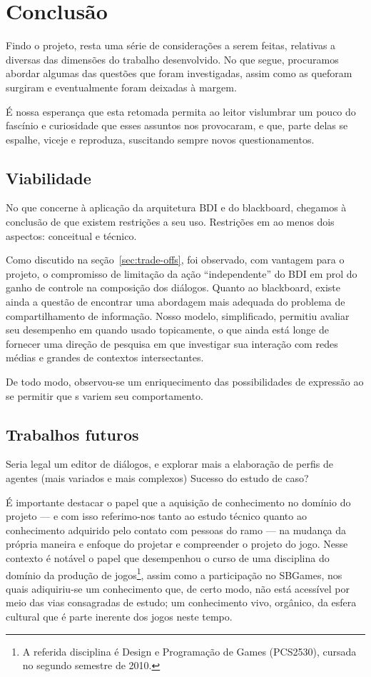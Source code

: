 \chapter{Conclusão}


Findo o projeto, resta uma série de considerações a serem feitas,
relativas a diversas das dimensões do trabalho desenvolvido. No que
segue, procuramos abordar algumas das questões que foram investigadas,
assim como as queforam surgiram e eventualmente foram deixadas à
margem.


É nossa esperança que esta retomada permita ao leitor vislumbrar um
pouco do fascínio e curiosidade que esses assuntos nos provocaram, e
que, parte delas se espalhe, viceje e reproduza, suscitando sempre
novos questionamentos.

\section{Viabilidade}

No que concerne à aplicação da arquitetura BDI e do blackboard,
chegamos à conclusão de que existem restrições a seu uso. Restrições
em ao menos dois aspectos: conceitual e técnico. 

Como discutido na seção~\ref{sec:trade-offs}, foi observado, com
vantagem para o projeto, o compromisso de limitação da ação
``independente'' do BDI em prol do ganho de controle na composição dos
diálogos. Quanto ao blackboard, existe ainda a questão de encontrar
uma abordagem mais adequada do problema de compartilhamento de
informação. Nosso modelo, simplificado, permitiu avaliar seu
desempenho em quando usado topicamente, o que ainda está longe de
fornecer uma direção de pesquisa em que investigar sua interação com
redes médias e grandes de contextos intersectantes.

De todo modo, observou-se um enriquecimento das possibilidades de
expressão ao se permitir que \npc{}s variem seu comportamento.

\section{Trabalhos futuros}

Seria legal um editor de diálogos, e explorar mais a elaboração de
perfis de agentes (mais variados e mais complexos)
Sucesso do estudo de caso?


É importante destacar o papel que a aquisição de conhecimento no
domínio do projeto --- e com isso referimo-nos tanto ao estudo técnico
quanto ao conhecimento adquirido pelo contato com pessoas do ramo ---
na mudança da própria maneira e enfoque do projetar e compreender o
projeto do jogo. Nesse contexto é notável o papel que desempenhou o
curso de uma disciplina do domínio da produção de
jogos\footnote{A referida disciplina é Design e Programação de Games
  (\textsc{PCS2530}), cursada no segundo semestre de 2010.}, assim
como a participação no SBGames, nos quais adiquiriu-se um conhecimento
que, de certo modo, não está acessível por meio das vias consagradas
de estudo; um conhecimento vivo, orgânico, da esfera cultural que é
parte inerente dos jogos neste tempo.

